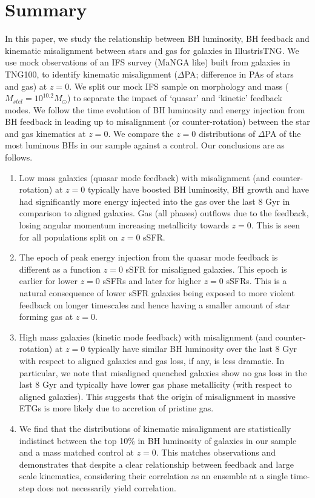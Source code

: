 \documentclass[fleqn,usenatbib]{mnras}
\begin{document}
\section{Summary} \label{sec:conclusion}
In this paper, we study the relationship between BH luminosity, BH feedback and kinematic misalignment between stars and gas for galaxies in IllustrisTNG. We use mock observations of an IFS survey (MaNGA like) built from galaxies in TNG100, to identify kinematic misalignment ($\Delta$PA; difference in PAs of stars and gas) at $z=0$. We split our mock IFS sample on morphology and mass ($M_{stel} = 10^{10.2}M_{\odot}$) to separate the impact of `quasar' and `kinetic' feedback modes. We follow the time evolution of BH luminosity and energy injection from BH feedback in leading up to misalignment (or counter-rotation) between the star and gas kinematics at $z=0$. We compare the $z=0$ distributions of $\Delta$PA of the most luminous BHs in our sample against a control. Our conclusions are as follows.
\begin{enumerate}
    \item Low mass galaxies (quasar mode feedback) with misalignment (and counter-rotation) at $z=0$ typically have boosted BH luminosity, BH growth and have had significantly more energy injected into the gas over the last 8 Gyr in comparison to aligned galaxies. Gas (all phases) outflows due to the feedback, losing angular momentum increasing metallicity towards $z=0$. This is seen for all populations split on $z=0$ sSFR.
    \item The epoch of peak energy injection from the quasar mode feedback is different as a function $z=0$ sSFR for misaligned galaxies. This epoch is earlier for lower $z=0$ sSFRs and later for higher $z=0$ sSFRs. This is a natural consequence of lower sSFR galaxies being exposed to more violent feedback on longer timescales and hence having a smaller amount of star forming gas at $z=0$. 
    \item High mass galaxies (kinetic mode feedback) with misalignment (and counter-rotation) at $z=0$ typically have similar BH luminosity over the last 8 Gyr with respect to aligned galaxies and gas loss, if any, is less dramatic. In particular, we note that misaligned quenched galaxies show no gas loss in the last 8 Gyr and typically have lower gas phase metallicity (with respect to aligned galaxies). This suggests that the origin of misalignment in massive ETGs is more likely due to accretion of pristine gas.
    \item We find that the distributions of kinematic misalignment are statistically indistinct between the top 10\% in BH luminosity of galaxies in our sample and a mass matched control at $z=0$. This matches observations \citep[see Figure 6 in][]{ilha2019} and demonstrates that despite a clear relationship between feedback and large scale kinematics, considering their correlation as an ensemble at a single time-step does not necessarily yield correlation.
\end{enumerate}
\end{document}
